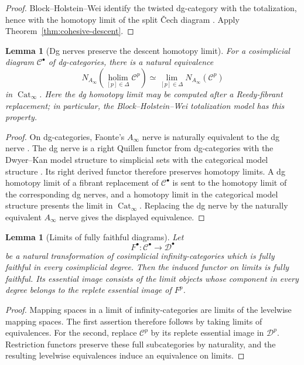 \documentclass[12pt]{amsart}
\newtheorem{lem}[thm]{Lemma}
\theoremstyle{definition}
\theoremstyle{remark}
\numberwithin{equation}{section}
\newcommand{\1}{{\mathbb{1}}}
\begin{document}
\begin{proof}
Block--Holstein--Wei identify the twisted dg-category with the
totalization, hence with the homotopy limit of the split \v{C}ech
diagram \cite[Theorem 4.1]{BHW17}.  Apply
Theorem~\ref{thm:cohesive-descent}.
\end{proof}

\begin{lem}[Dg nerves preserve the descent homotopy limit]
\label{lem:nerve-holim}
For a cosimplicial diagram $\mathcal C^\bullet$ of dg-categories,
there is a natural equivalence
\[
 N_{A_\infty}\left(
  \operatorname*{holim}_{[p]\in\Delta}\mathcal C^p
 \right)
 \simeq
 \lim_{[p]\in\Delta}
 N_{A_\infty}(\mathcal C^p)
\]
in $\operatorname{Cat}_\infty$.  Here the dg homotopy limit may be
computed after a Reedy-fibrant replacement; in particular, the
Block--Holstein--Wei totalization model has this property.
\end{lem}

\begin{proof}
On dg-categories, Faonte's $A_\infty$ nerve is naturally equivalent
to the dg nerve \cite[Section 2]{Fao17}.  The dg nerve is a right
Quillen functor from dg-categories with the Dwyer--Kan model structure
to simplicial sets with the categorical model structure
\cite[Proposition 1.3.1.20]{LurHA}.  Its right derived functor
therefore preserves homotopy limits.  A dg homotopy limit of a
fibrant replacement of $\mathcal C^\bullet$ is sent to the homotopy
limit of the corresponding dg nerves, and a homotopy limit in the
categorical model structure presents the limit in
$\operatorname{Cat}_\infty$.  Replacing the dg nerve by the naturally
equivalent $A_\infty$ nerve gives the displayed equivalence.
\end{proof}

\begin{lem}[Limits of fully faithful diagrams]
\label{lem:limit-fully-faithful}
Let
\[
 F^\bullet:\mathcal C^\bullet\longrightarrow\mathcal D^\bullet
\]
be a natural transformation of cosimplicial infinity-categories which
is fully faithful in every cosimplicial degree.  Then the induced
functor on limits is fully faithful.  Its essential image consists of
the limit objects whose component in every degree belongs to the
replete essential image of $F^p$.
\end{lem}

\begin{proof}
Mapping spaces in a limit of infinity-categories are limits of the
levelwise mapping spaces.  The first assertion therefore follows by
taking limits of equivalences.  For the second, replace
$\mathcal C^p$ by its replete essential image in $\mathcal D^p$.
Restriction functors preserve these full subcategories by naturality,
and the resulting levelwise equivalences induce an equivalence on
limits.
\end{proof}
\end{document}
